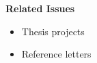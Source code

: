 \begin{frame}
	\begin{figure}
	\end{figure}
\end{frame}
\begin{frame}
	\textbf{Related Issues}\vspace{0.3cm}

	\begin{itemize}\setlength\itemsep{1em}
	\item Thesis projects
	\item Reference letters
	\end{itemize}
\end{frame}
